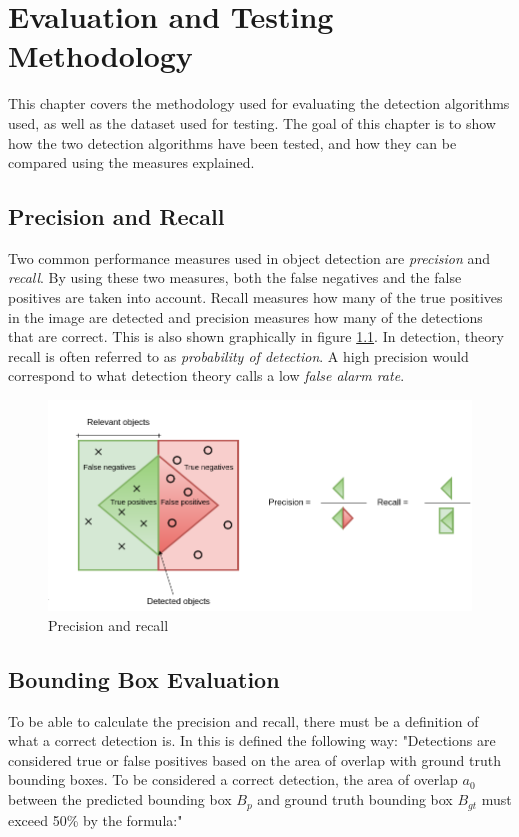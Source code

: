 
\chapter{Evaluation and Testing Methodology}
This chapter covers the methodology used for evaluating the detection algorithms used, as well as the dataset used for testing. The goal of this chapter is to show how the two detection algorithms have been tested, and how they can be compared using the measures explained.

\section{Precision and Recall}
\label{sec:prec_rec}

Two common performance measures used in object detection are \textit{precision} and \textit{recall}. By using these two measures, both the false negatives and the false positives are taken into account. Recall measures how many of the true positives in the image are detected and precision measures how many of the detections that are correct. This is also shown graphically in figure \ref{fig:prec_recall}. In detection, theory recall is often referred to as \textit{probability of detection}. A high precision would correspond to what detection theory calls a low \textit{false alarm rate}.

\begin{figure}[h!]
    \centering
    \includegraphics[scale=0.33]{fig/recall_precision.png}
    \caption{Precision and recall}
    \label{fig:prec_recall}
\end{figure}


\newpage

\section{Bounding Box Evaluation}
To be able to calculate the precision and recall, there must be a definition of what a correct detection is. In \citep{Everinghama} this is defined the following way: "Detections are considered true or false positives based on the area of overlap
with ground truth bounding boxes. To be considered a correct detection, the area of overlap $a_0$ between the predicted bounding box $B_p$ and ground truth bounding box $B_{gt}$ must exceed 50\% by the formula:"

